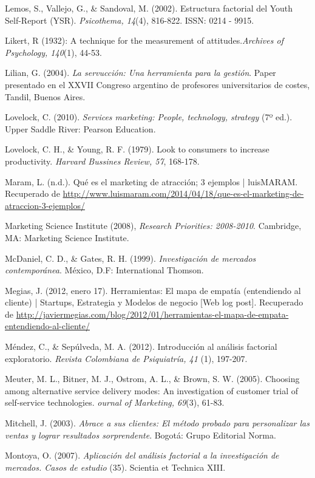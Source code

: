 \begin{thebibliography}{11}
	\bibitem{}
		Lemos, S., Vallejo, G., \& Sandoval, M. (2002). Estructura factorial del Youth Self-Report (YSR). \emph{Psicothema, 14}(4), 816-822. ISSN: 0214 - 9915. 	

	\bibitem{}
		Likert, R (1932): A technique for the measurement of attitudes.\emph{Archives of Psychology, 140}(1), 44-53. 	

	\bibitem{}
		Lilian, G. (2004).  \emph{La servucción: Una herramienta para la gestión}. Paper presentado en el XXVII Congreso argentino de profesores universitarios de costes, Tandil, Buenos Aires.  

	\bibitem{}
		Lovelock, C. (2010).  \emph{Services marketing: People, technology, strategy} (7º ed.). Upper Saddle River: Pearson Education. 

	\bibitem{}
		Lovelock, C. H., \& Young, R. F. (1979). Look to consumers to increase productivity. \emph{Harvard Bussines Review, 57}, 168-178. 

	\bibitem{}
		Maram, L. (n.d.). Qué es el marketing de atracción; 3 ejemplos | luisMARAM. Recuperado de \url{http://www.luismaram.com/2014/04/18/que-es-el-marketing-de-atraccion-3-ejemplos/}

	\bibitem{}
		Marketing Science Institute (2008), \emph{Research Priorities: 2008-2010}. Cambridge, MA: Marketing Science Institute.  

	\bibitem{}
		McDaniel, C. D., \& Gates, R. H. (1999). \emph{Investigación de mercados contemporánea}. México, D.F: International Thomson. 

	\bibitem{}
		Megias, J. (2012, enero 17). Herramientas: El mapa de empatía (entendiendo al cliente) | Startups, Estrategia y Modelos de negocio [Web log post].  Recuperado de \url{http://javiermegias.com/blog/2012/01/herramientas-el-mapa-de-empata-entendiendo-al-cliente/}

	\bibitem{}
		Méndez, C., \& Sepúlveda, M. A. (2012). Introducción al análisis factorial exploratorio.  \emph{Revista Colombiana de Psiquiatría, 41} (1), 197-207.

	\bibitem{}
		Meuter, M. L., Bitner, M. J., Ostrom, A. L., \& Brown, S. W. (2005). Choosing among alternative service delivery modes: An investigation of customer trial of self-service technologies. \emph{ournal of Marketing, 69}(3), 61-83.

	\bibitem{}
		Mitchell, J. (2003). \emph{Abrace a sus clientes: El método probado para personalizar las ventas y lograr resultados sorprendente}. Bogotá: Grupo Editorial Norma. 

	\bibitem{}
		Montoya, O. (2007). \emph{Aplicación del análisis factorial a la investigación de mercados. Casos de estudio} (35). Scientia et Technica XIII. 


\end{thebibliography}

